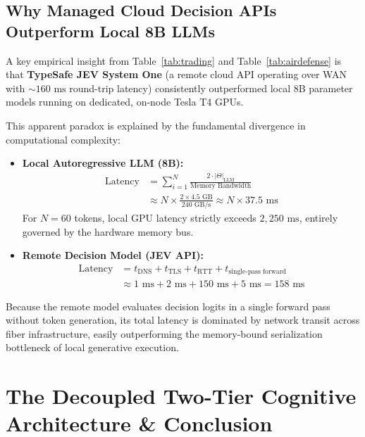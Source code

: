 \documentclass[journal,compsoc]{IEEEtran}
\begin{document}
\subsection{Why Managed Cloud Decision APIs Outperform Local 8B LLMs}
A key empirical insight from Table~\ref{tab:trading} and Table~\ref{tab:airdefense} is that \textbf{TypeSafe JEV System One} (a remote cloud API operating over WAN with $\sim 160 \text{ ms}$ round-trip latency) consistently outperformed local 8B parameter models running on dedicated, on-node Tesla T4 GPUs.

This apparent paradox is explained by the fundamental divergence in computational complexity:
\begin{itemize}
    \item \textbf{Local Autoregressive LLM (8B):}
    \begin{equation}
    \begin{aligned}
    \text{Latency} &= \sum_{i=1}^{N} \frac{2 \cdot |\Theta|_{\text{LLM}}}{\text{Memory Bandwidth}} \\
    &\approx N \times \frac{2 \times 4.5 \text{ GB}}{240 \text{ GB/s}} \approx N \times 37.5 \text{ ms}
    \end{aligned}
    \end{equation}
    For $N = 60$ tokens, local GPU latency strictly exceeds $2,250 \text{ ms}$, entirely governed by the hardware memory bus.
    \item \textbf{Remote Decision Model (JEV API):}
    \begin{align}
    \text{Latency} &= t_{\text{DNS}} + t_{\text{TLS}} + t_{\text{RTT}} + t_{\text{single-pass forward}} \nonumber \\
    &\approx 1 \text{ ms} + 2 \text{ ms} + 150 \text{ ms} + 5 \text{ ms} = 158 \text{ ms}
    \end{align}
\end{itemize}
Because the remote model evaluates decision logits in a single forward pass without token generation, its total latency is dominated by network transit across fiber infrastructure, easily outperforming the memory-bound serialization bottleneck of local generative execution.

\section{The Decoupled Two-Tier Cognitive Architecture \& Conclusion}
\end{document}
